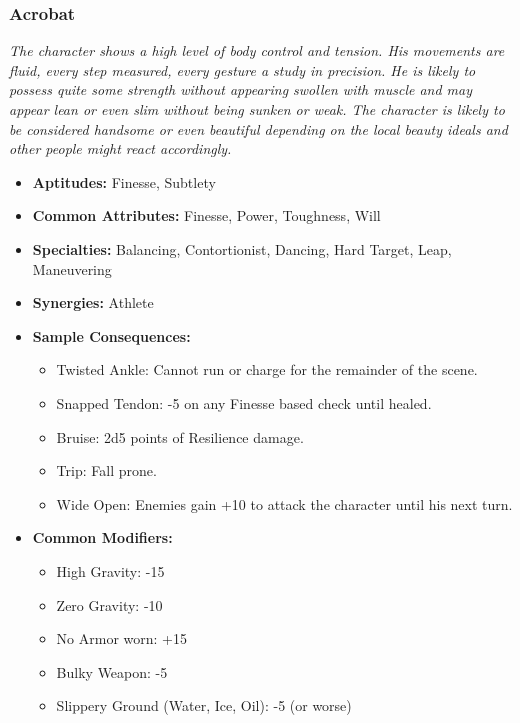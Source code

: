 \subsubsection{Acrobat}\label{Acrobat}
\textit{The character shows a high level of body control and tension. 
His movements are fluid, every step measured, every gesture a study in precision.
He is likely to possess quite some strength without appearing swollen with muscle and may appear lean or even slim without being sunken or weak.
The character is likely to be considered handsome or even beautiful depending on the local beauty ideals and other people might react accordingly.}
\begin{itemize}
	\item \textbf{Aptitudes:} Finesse, Subtlety
	\item \textbf{Common Attributes:} Finesse, Power, Toughness, Will
	\item \textbf{Specialties:} Balancing, Contortionist, Dancing, Hard Target, Leap, Maneuvering
	\item \textbf{Synergies:} Athlete
	\item \textbf{Sample Consequences:} 
	\begin{itemize}
		\item Twisted Ankle: Cannot run or charge for the remainder of the scene.
		\item Snapped Tendon: -5 on any Finesse based check until healed.
		\item Bruise: 2d5 points of Resilience damage.
		\item Trip: Fall prone.
		\item Wide Open: Enemies gain +10 to attack the character until his next turn.
	\end{itemize}
	\item \textbf{Common Modifiers:}
	\begin{itemize}
		\item High Gravity: -15
		\item Zero Gravity: -10
		\item No Armor worn: +15
		\item Bulky Weapon: -5
		\item Slippery Ground (Water, Ice, Oil): -5 (or worse)
	\end{itemize}
\end{itemize}

